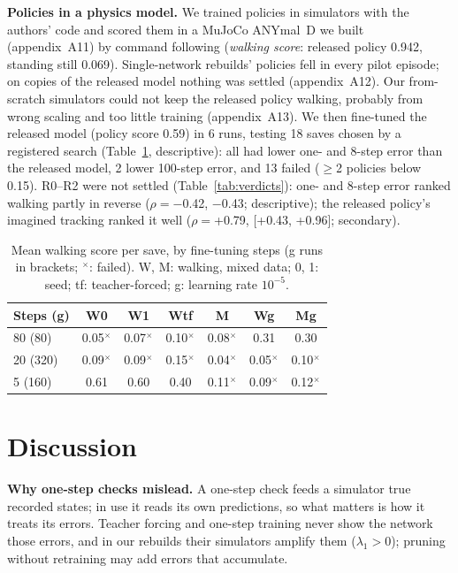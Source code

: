 \textbf{Policies in a physics model.}\label{sec:step2}
We trained policies in simulators with the authors' code and scored them in a MuJoCo ANYmal~D we built
(appendix~A11) by command following (\emph{walking score}: released policy 0.942, standing still 0.069). Single-network rebuilds' policies fell in every pilot episode; on copies of the released
model nothing was settled (appendix~A12). Our
from-scratch simulators could not keep the released policy walking, probably from wrong scaling and too little
training (appendix~A13). We then fine-tuned the released model (policy score 0.59) in 6 runs, testing 18 saves
chosen by a registered search (Table~\ref{tab:ladder}, descriptive): all had lower one- and 8-step error than the released model,
2 lower 100-step error, and 13 failed ($\geq$2 policies below 0.15). R0--R2 were not settled (Table~\ref{tab:verdicts}):
one- and 8-step error ranked walking partly in reverse ($\rho={}$$-$0.42, $-$0.43; descriptive); the released policy's imagined tracking ranked it
well ($\rho={}$+0.79, [+0.43, +0.96]; secondary).

\begin{table}[t]
\centering
\caption{Mean walking score per save, by fine-tuning steps (g runs in brackets; $^\times$: failed). W, M: walking, mixed data; 0, 1: seed; tf:
teacher-forced; g: learning rate $10^{-5}$.}
\label{tab:ladder}
\scriptsize
\setlength{\tabcolsep}{3pt}
\begin{tabular}{@{}lcccccc@{}}
\toprule
Steps (g) & W0 & W1 & Wtf & M & Wg & Mg \\
\midrule
80 (80) & 0.05$^\times$ & 0.07$^\times$ & 0.10$^\times$ & 0.08$^\times$ & 0.31 & 0.30 \\
20 (320) & 0.09$^\times$ & 0.09$^\times$ & 0.15$^\times$ & 0.04$^\times$ & 0.05$^\times$ & 0.10$^\times$ \\
5 (160) & 0.61 & 0.60 & 0.40 & 0.11$^\times$ & 0.09$^\times$ & 0.12$^\times$ \\
\bottomrule
\end{tabular}
\end{table}

\section{Discussion}\label{sec:discussion}
\textbf{Why one-step checks mislead.} A one-step check feeds a simulator true recorded states; in use it reads
its own predictions, so what matters is how it treats its errors. Teacher forcing and one-step training never show
the network those errors, and in our rebuilds their simulators amplify them ($\lambda_1>0$); pruning without retraining may add errors that accumulate.

